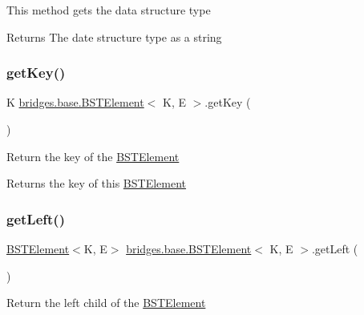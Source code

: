 This method gets the data structure type

\begin{DoxyReturn}{Returns}
The date structure type as a string 
\end{DoxyReturn}
\mbox{\label{classbridges_1_1base_1_1_b_s_t_element_afba950fad36d3327b01003df3ba4cc9f}} 
\subsubsection{\texorpdfstring{getKey()}{getKey()}}
{\footnotesize\ttfamily K \mbox{\hyperlink{classbridges_1_1base_1_1_b_s_t_element}{bridges.\+base.\+B\+S\+T\+Element}}$<$ K, E $>$.get\+Key (\begin{DoxyParamCaption}{ }\end{DoxyParamCaption})}

Return the key of the \mbox{\hyperlink{classbridges_1_1base_1_1_b_s_t_element}{B\+S\+T\+Element}}

\begin{DoxyReturn}{Returns}
the key of this \mbox{\hyperlink{classbridges_1_1base_1_1_b_s_t_element}{B\+S\+T\+Element}} 
\end{DoxyReturn}
\mbox{\label{classbridges_1_1base_1_1_b_s_t_element_a8abdd6e4a0486de7fa45fbb233b56688}} 
\subsubsection{\texorpdfstring{getLeft()}{getLeft()}}
{\footnotesize\ttfamily \mbox{\hyperlink{classbridges_1_1base_1_1_b_s_t_element}{B\+S\+T\+Element}}$<$K, E$>$ \mbox{\hyperlink{classbridges_1_1base_1_1_b_s_t_element}{bridges.\+base.\+B\+S\+T\+Element}}$<$ K, E $>$.get\+Left (\begin{DoxyParamCaption}{ }\end{DoxyParamCaption})}

Return the left child of the \mbox{\hyperlink{classbridges_1_1base_1_1_b_s_t_element}{B\+S\+T\+Element}}


